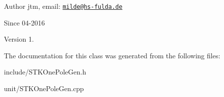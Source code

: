 \begin{DoxyAuthor}{Author}
jtm, email\+:  \href{mailto:milde@hs-fulda.de}{\tt milde@hs-\/fulda.\+de} 
\end{DoxyAuthor}
\begin{DoxySince}{Since}
04-\/2016 
\end{DoxySince}
\begin{DoxyVersion}{Version}
1. 
\end{DoxyVersion}


The documentation for this class was generated from the following files\+:\begin{DoxyCompactItemize}
\item 
include/S\+T\+K\+One\+Pole\+Gen.\+h\item 
unit/S\+T\+K\+One\+Pole\+Gen.\+cpp\end{DoxyCompactItemize}
